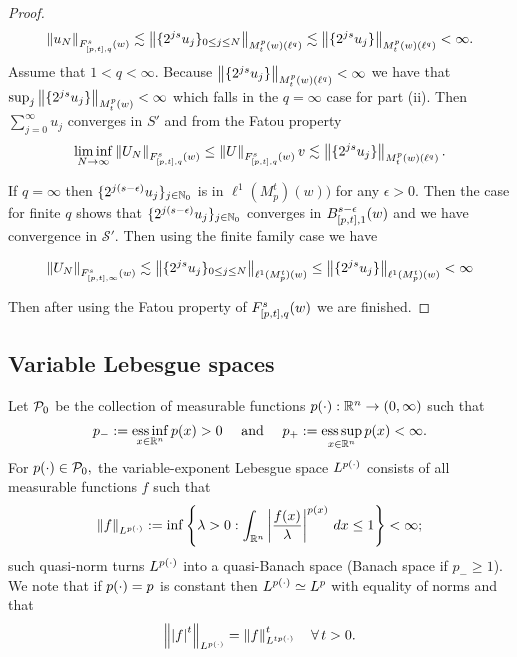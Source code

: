 \begin{proof}
$$ \norm{u_N}{\itlw{[p,t]}{s}{q}{w}} \lesssim \norm{{\{2^{js}}u_j\}_{0\leq j\leq N} }{\mow{t}{p}{w}(\ell^q)} \lesssim \norm{{\{2^{js}}u_j\}}{\mow{t}{p}{w}(\ell^q)} <\infty.$$ Assume that $1<q<\infty$. Because $\norm{{\{2^{js}}u_j\}}{\mow{t}{p}{w}(\ell^q)} <\infty$ we have that $\sup_j\norm{{\{2^{js}}u_j\}}{\mow{t}{p}{w}} <\infty$ which falls in the $q=\infty$ case for part (ii). Then $\sum_{j=0}^\infty u_j$ converges in $S'$ and from the Fatou property 
\[\liminf_{N\rightarrow\infty} \norm{U_N}{\itlw{[p,t]}{s}{q}{w}} \leq \norm{U}{\itlw{[p,t]}{s}{q}{w}}v\lesssim \norm{{\{2^{js}}u_j\}}{\mow{t}{p}{w}(\ell^q)}. \]

If $q=\infty$ then $\{2^{j(s-\epsilon)}u_j\}_{j\in\naz}$ is in $\ell^1(M^t_p)(w))$ for any $\epsilon>0$. Then the case for finite $q$ shows that $\{2^{j(s-\epsilon)}u_j\}_{j\in\naz}$ converges in ${\ibesw{[p,t]}{s-\epsilon}{1}{w}}$ and we have convergence in $\mathcal{S}'$. Then using the finite family case we have 


\[ \norm{U_N}{F^s_{[p,t],\infty}(w)} \lesssim \norm{ \{ 2^{js}u_j \}_{0\leq j\leq N }}{\ell^1(M^t_p)(w)} \leq \norm{ \{ 2^{js}u_j \} }{\ell^1(M^t_p)(w)} < \infty \] 

 Then after using the Fatou property of  $\itlw{[p,t]}{s}{q}{w}$ we are finished.
\end{proof}
\subsection{Variable Lebesgue spaces}
 
 Let  $\P_0$ be the collection of  measurable functions $\pp : \rn \rightarrow (0,\infty)$  such that
\begin{equation*}
p_- := \essinf_{x\in \rn} p(x)>0 \quad\text{ and } \quad p_+ := \esssup_{x\in \rn} p(x)<\infty.
\end{equation*}
For $\pp\in\P_0,$   the variable-exponent Lebesgue space $\Lp$
consists of all measurable functions $f$ such that 
\begin{equation*}
\norm{f}{L^{p(\cdot)}}:=\inf\left\{\lambda>0: \int_{\rn} \abs{\frac{f(x)}{\lambda}}^{p(x)}\,dx\le 1\right\}<\infty;
\end{equation*}
such quasi-norm turns $\Lp$ into  a quasi-Banach  space (Banach space if $p_-\ge1$). 
We note that if $\pp=p$ is constant then  $\Lp\simeq L^p$ with equality of norms and that
\begin{equation}\label{eq:power}
\norm{\abs{f}^t}{\Lp}=\norm{f}{L^{t\pp}}^t\quad \forall\, t>0.
\end{equation} 

